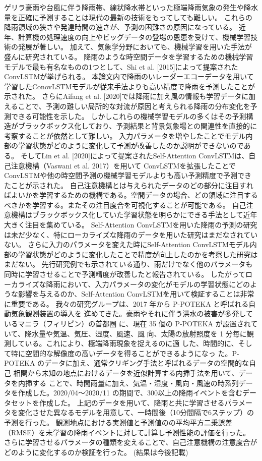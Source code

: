 ゲリラ豪雨や台風に伴う降雨帯、線状降水帯といった極端降雨気象の発生や降水量を正確に予測することは現代の最新の技術をもってしても難しい。
これらの降雨領域の狭さや発達時間の速さが、予測の困難さの原因になっている。
近年、計算機の処理速度の向上やビッグデータの登場の恩恵を受けて、機械学習技術の発展が著しい。
加えて、気象学分野においても、機械学習を用いた手法が盛んに研究されている。
降雨のような時空間データを学習するための機械学習モデルで最も有名なものの1つとして、Shi et al. [2015]によって提案されたConvLSTMが挙げられる。
本論文内で降雨のいレーダーエコーデータを用いて学習したConovLSTMモデルが従来手法よりも高い精度で降雨を予測したことが示された。
さらにAifang et al. [2020]では降雨に加え風の情報も学習データに加えることで、予測の難しい局所的な対流が原因と考えられる降雨の分布変化を予測できる可能性を示した。
しかしこれらの機械学習モデルの多くはその予測構造がブラックボックス化しており、予測結果と背景気象場との関連性を直接的に考察することが依然として難しい。
入力パラメータを増やしたことでモデル内部の学習状態がどのように変化して予測が改善したのか説明ができないのである。
そしてLin et al. [2020]によって提案されたSelf-Attention ConvLSTMは、自己注意機構（Vaswani et al. 2017）を用いて
ConvLSTMを拡張したことでConvLSTMや他の時空間予測の機械学習モデルよりも高い予測精度で予測できたことが示された。
自己注意機構とは与えられたデータのどの部分に注目すればよいかを学習するための機構である。空間データの場合、どの領域に注目するべきかを学習する。またその注目度合を可視化することが可能である。
自己注意機構はブラックボックス化していた学習状態を明らかにできる手法として近年大きく注目を集めている。
Self-Attention ConvLSTMを用いた降雨の予測の研究は未だ少なく、特にローカライズな降雨のデータを用いた研究はまだなされていない。
さらに入力のパラメータを変えた時にSelf-Attention ConvLSTMモデル内部の学習状態がどのように変化したことで精度が向上したのかを考察した研究はまだない。
先行研究例でも示されている通り、雨だけでなく他のパラメータも同時に学習させることで予測精度が改善したと報告されている。
したがってローカライズな降雨において、入力パラメータの変化がモデルの学習状態にどのような影響を与えるのか、Self-Attention ConvLSTMを用いて検証することは非常に重要である。
我々の研究グループは、2017 年から P-POTEKA と呼ばれる自動気象観測装置の導入を
進めてきた。豪雨やそれに伴う洪水の被害が多発しているマニラ（フィリピン）の首都圏
に、現在 35 個の P-POTEKA が設置されていて、降水量や気温、気圧、湿度、風速、風
向、太陽の放射照度を 1 分毎に観測している。これにより、極端降雨現象を捉えるのに適
した、時間的に、そして特に空間的な解像度の高いデータを得ることができるようになっ
た。P-POTEKA のデータに加え、通常クリギング手法と呼ばれるデータの空間的な自己
相関から未知の地点におけるデータを近似計算する内挿手法を用いて、データを内挿する
ことで、時間雨量に加え、気温・湿度・風向・風速の時系列データを作成した。2020/04～2020/11 の期間で、300以上の降雨イベントを含むデータセットを作成した。
上記のデータを用いて、降雨と共に学習させるパラメータを変化させた異なるモデルを用意して、一時間後（10分間隔で6ステップ）の予測を行った。
観測地点における実測値と予測値のの平均平方二乗誤差（RMSE）を未学習の降雨イベントに対して計算し予測性能の評価を行った。
さらに学習させるパラメータの種類を変えることで、自己注意機構の注意度合がどのように変化するのか検証を行った。
(結果は今後記載)